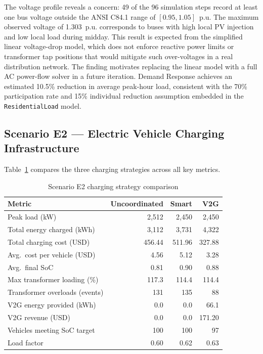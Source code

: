 The voltage profile reveals a concern: 49 of the 96 simulation steps record at least one bus voltage outside the ANSI C84.1 range of $[0.95, 1.05]$~p.u. The maximum observed voltage of 1.303~p.u. corresponds to buses with high local PV injection and low local load during midday. This result is expected from the simplified linear voltage-drop model, which does not enforce reactive power limits or transformer tap positions that would mitigate such over-voltages in a real distribution network. The finding motivates replacing the linear model with a full AC power-flow solver in a future iteration. Demand Response achieves an estimated 10.5\% reduction in average peak-hour load, consistent with the 70\% participation rate and 15\% individual reduction assumption embedded in the \texttt{ResidentialLoad} model.

\subsection{Scenario E2 --- Electric Vehicle Charging Infrastructure}

Table~\ref{tab:e2_results} compares the three charging strategies across all key metrics.

\begin{table}[h]
    \centering
    \caption{Scenario E2 charging strategy comparison}
    \label{tab:e2_results}
    \begin{tabular}{lrrr}
        \toprule
        \textbf{Metric} & \textbf{Uncoordinated} & \textbf{Smart} & \textbf{V2G} \\
        \midrule
        Peak load (kW)                     & 2{,}512  & 2{,}450  & 2{,}450  \\
        Total energy charged (kWh)         & 3{,}112  & 3{,}731  & 4{,}322  \\
        Total charging cost (USD)          & 456.44   & 511.96   & 327.88   \\
        Avg.\ cost per vehicle (USD)       & 4.56     & 5.12     & 3.28     \\
        Avg.\ final SoC                    & 0.81     & 0.90     & 0.88     \\
        Max transformer loading (\%)       & 117.3    & 114.4    & 114.4    \\
        Transformer overloads (events)     & 131      & 135      & 88       \\
        V2G energy provided (kWh)          & 0.0      & 0.0      & 66.1     \\
        V2G revenue (USD)                  & 0.0      & 0.0      & 171.20   \\
        Vehicles meeting SoC target        & 100      & 100      & 97       \\
        Load factor                        & 0.60     & 0.62     & 0.63     \\
        \bottomrule
    \end{tabular}
\end{table}

